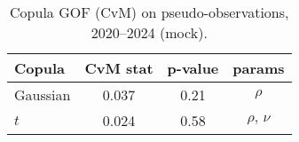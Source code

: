 \begin{table}[t]
  \centering
  \small
  \caption{Copula GOF (CvM) on pseudo-observations, 2020--2024 (mock).}
  \begin{tabular}{lccc}
    \toprule
    Copula & CvM stat & p-value & params \\
    \midrule
    Gaussian & 0.037 & 0.21 & $\rho$ \\
    $t$      & 0.024 & 0.58 & $\rho,\,\nu$ \\
    \bottomrule
  \end{tabular}
\end{table}
